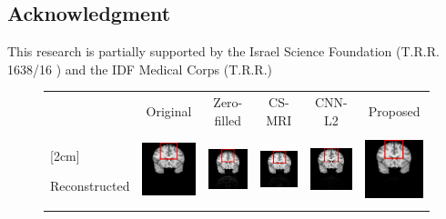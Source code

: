 \documentclass[review]{elsarticle}
\begin{document}
\subsection{Acknowledgment}
This research is partially supported by the Israel Science Foundation (T.R.R. 1638/16 ) and the IDF Medical Corps (T.R.R.)


\begin{figure}
	\begin{raggedright}
		
		\begin{tabular}{>{\centering}b{0.2cm}lcccc}
			& \multicolumn{1}{c}{{\footnotesize{}Original}} & {\footnotesize{}Zero-filled} & {\footnotesize{}CS-MRI} & {\footnotesize{}CNN-L2} & {\footnotesize{}Proposed}\tabularnewline
			\multirow{1}{0.2cm}[2cm]{\begin{turn}{90}
					{\footnotesize{}Reconstructed}
				\end{turn}} & \includegraphics[width=2.5cm]{include/grp1/res1_org} & \includegraphics[width=2.5cm]{include/grp1/res1_zero} & \includegraphics[width=2.5cm]{include/grp1/res1_cs_red} & \includegraphics[width=2.5cm]{include/grp1/res1_L2_red} & \includegraphics[width=2.5cm]{include/grp1/res1_our}\tabularnewline

\end{tabular}
\end{raggedright}
\end{figure}
\end{document}

